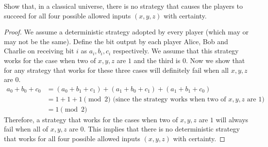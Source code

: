 \begin{solution}[label=ques:3a]
  \begin{question}
    Show that, in a classical universe, there is no strategy that
causes the players to succeed for all four possible
allowed inputs $(x,y,z)$ with certainty.
  \end{question}
  \tcblower{}
  \begin{proof}
    We assume a deterministic strategy adopted by every player (which may or may not be the same). Define the bit output by each player Alice, Bob and Charlie on receiving bit $i$ as $a_i, b_i, c_i$ respectively. We assume that this strategy works for the case when two of $x, y, z$ are $1$ and the third is $0$. Now we show that for any strategy that works for these three cases will definitely fail when all $x, y, z$ are $0$.
    \begin{equation}
      \begin{split}
        a_0 + b_0 + c_0 &= (a_0 + b_1 + c_1) + (a_1 + b_0 + c_1) + (a_1 + b_1 + c_0)\\
        &= 1 + 1 + 1 \pmod{2}\text{ (since the strategy works when two of $x, y, z$ are $1$)}\\
        &= 1 \pmod{2}
      \end{split}
      \label{eq:ghzfail}
    \end{equation}
    Therefore, a strategy that works for the cases when two of $x, y, z$ are $1$ will always fail when all of $x, y, z$ are $0$. This implies that there is no deterministic strategy that works for all four possible allowed inputs $(x, y, z)$ with certainty.
  \end{proof}
\end{solution}

